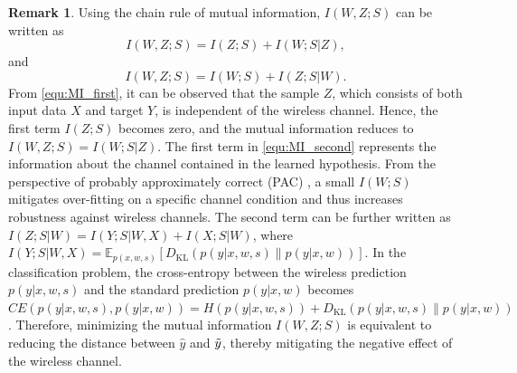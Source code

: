 \documentclass[lettersize,journal]{IEEEtran}
\newcommand{\E}{\mathbb{E}}
\theoremstyle{definition}
\newtheorem{remark}{Remark}
\theoremstyle{plain}
\begin{document}
\begin{remark}
    \label{thm:chain_rule}
    Using the chain rule of mutual information, $I(W,Z;S)$ can be written as
    \begin{equation}
        \label{equ:MI_first}
        I(W,Z;S) = I(Z;S) + I(W;S|Z),
    \end{equation}
    and
    \begin{equation}
        \label{equ:MI_second}
        I(W,Z;S) = I(W;S) + I(Z;S|W).
    \end{equation}
    From \cref{equ:MI_first}, it can be observed that the sample $Z$, which consists of both input data $X$ and target $Y$, is independent of the wireless channel. Hence, the first term $I(Z;S)$ becomes zero, and the mutual information reduces to $I(W,Z;S) = I(W;S|Z)$.
    The first term in \cref{equ:MI_second} represents the information about the channel contained in the learned hypothesis. From the perspective of probably approximately correct (PAC) \cite{PAC-Bayes}, a small $I(W;S)$ mitigates over-fitting on a specific channel condition and thus increases robustness against wireless channels. The second term can be further written as $I(Z;S|W) = I(Y;S|W,X) + I(X;S|W)$, where $I(Y;S|W,X) = \E_{p(x,w,s)}\left[D_{\text{KL}}(p(y|x,w,s)\|p(y|x,w))\right]$. 
    In the classification problem, the cross-entropy between the wireless prediction $p(y|x,w,s)$ and the standard prediction $p(y|x,w)$ becomes $CE\left(p(y|x,w,s), p(y|x,w)\right) = H(p(y|x,w,s)) + D_{\text{KL}}(p(y|x,w,s)\|p(y|x,w))$. Therefore, minimizing the mutual information $I(W,Z;S)$ is equivalent to reducing the distance between $\hat{y}$ and $\Tilde{y}$, thereby mitigating the negative effect of the wireless channel.
\end{remark}
\end{document}
